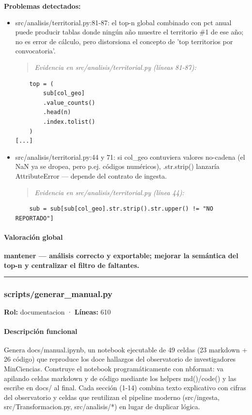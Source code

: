 \begin{tcolorbox}[riesgo]
\textbf{Problemas detectados:}
\begin{itemize}
  \item src/analisis/territorial.py:81-87: el top-n global combinado con pct anual puede producir tablas donde ningún año muestre el territorio \#1 de ese año; no es error de cálculo, pero distorsiona el concepto de 'top territorios por convocatoria'.
\begin{quote}\footnotesize\ttfamily
\noindent\emph{Evidencia en src/analisis/territorial.py (líneas 81-87):}
\end{quote}
\begin{lstlisting}
    top = (
        sub[col_geo]
        .value_counts()
        .head(n)
        .index.tolist()
    )
[...]
\end{lstlisting}

  \item src/analisis/territorial.py:44 y 71: si col\_geo contuviera valores no-cadena (el NaN ya se dropea, pero p.ej. códigos numéricos), .str.strip() lanzaría AttributeError --- depende del contrato de ingesta.
\begin{quote}\footnotesize\ttfamily
\noindent\emph{Evidencia en src/analisis/territorial.py (línea 44):}
\end{quote}
\begin{lstlisting}
    sub = sub[sub[col_geo].str.strip().str.upper() != "NO REPORTADO"]
\end{lstlisting}

\end{itemize}
\end{tcolorbox}

\paragraph{Valoración global}
\textbf{mantener --- análisis correcto y exportable; mejorar la semántica del top-n y centralizar el filtro de faltantes.}

\medskip
\hrule

\subsubsection{scripts/generar\_manual.py}
\textbf{Rol:} documentacion · \textbf{Líneas:} 610

\paragraph{Descripción funcional}
Genera docs/manual.ipynb, un notebook ejecutable de 49 celdas (23 markdown + 26 código) que reproduce los doce hallazgos del observatorio de investigadores MinCiencias. Construye el notebook programáticamente con nbformat: va apilando celdas markdown y de código mediante los helpers md()/code() y las escribe en docs/ al final. Cada sección (1-14) combina texto explicativo con cifras del observatorio y celdas que reutilizan el pipeline moderno (src/ingesta, src/Transformacion.py, src/analisis/*) en lugar de duplicar lógica.

